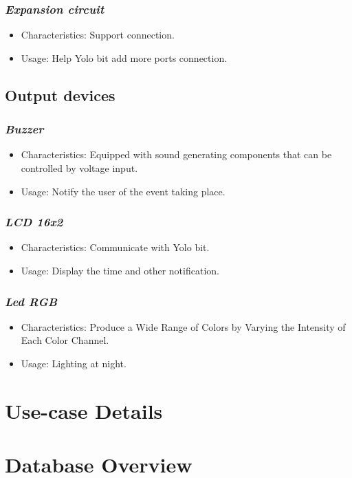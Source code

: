 \documentclass[a4paper, 13pt]{article}
\theoremstyle{definition}
\begin{document}
\subsubsection {\textit{Expansion circuit}}
\begin{itemize}
    \item Characteristics: Support connection.
    \item Usage: Help Yolo bit add more ports connection.
\end{itemize}

\subsection{Output devices}
\subsubsection {\textit{Buzzer}}
\begin{itemize}
    \item Characteristics: Equipped with sound generating components that can be controlled by voltage input.
    \item Usage: Notify the user of the event taking place.
\end{itemize}
\subsubsection {\textit{LCD 16x2}}
\begin{itemize}
    \item Characteristics: Communicate with Yolo bit.
    \item Usage: Display the time and other notification.
\end{itemize}
\subsubsection {\textit{Led RGB}}
\begin{itemize}
    \item Characteristics: Produce a Wide Range of Colors by Varying the Intensity of Each Color Channel.
    \item Usage: Lighting at night.
\end{itemize}
\section{Use-case Details}
\section{Database Overview}
\end{document}
